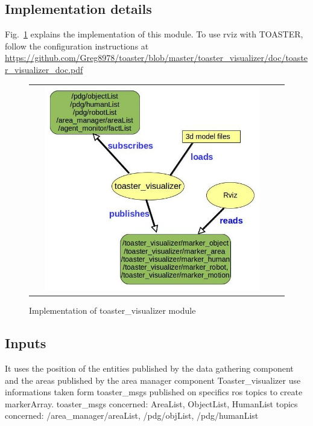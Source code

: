 \documentclass[a4paper]{article}
\begin{document}
\subsection{Implementation details}
Fig.~\ref{fig:visualizer}  explains the implementation of this module. To use rviz with TOASTER, follow the configuration instructions at \url{https://github.com/Greg8978/toaster/blob/master/toaster_visualizer/doc/toaster_visualizer_doc.pdf}
 \begin{figure}[ht!]

 \centering
 \begin{tabular}{cc}
  \includegraphics[width=0.9\textwidth]{img/visualizer.jpg}
 \end{tabular}
 \caption{Implementation of toaster\_visualizer module}
 \label{fig:visualizer}
 \end{figure}
\subsection{Inputs}
It uses the position of the entities published by the data gathering component and the areas published by the area manager component Toaster\_visualizer use informations taken form toaster\_msgs published on specifics ros topics to create markerArray.
toaster\_msgs concerned: AreaList, ObjectList, HumanList
topics concerned: /area\_manager/areaList, /pdg/objList, /pdg/humanList
\end{document}

